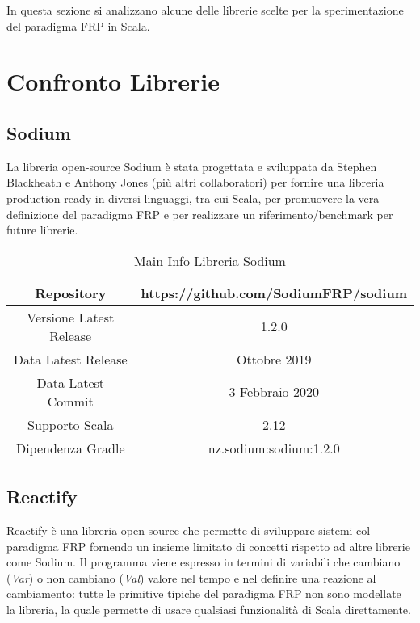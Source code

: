 \documentclass[../main.tex]{subfiles}
\begin{document}
In questa sezione si analizzano alcune delle librerie scelte per la sperimentazione del paradigma FRP in Scala.

\section{Confronto Librerie}

\subsection{Sodium}
La libreria open-source Sodium è stata progettata e sviluppata da Stephen Blackheath e Anthony Jones (più altri collaboratori) per fornire una libreria production-ready in diversi linguaggi, tra cui Scala, per promuovere la vera definizione del paradigma FRP e per realizzare un riferimento/benchmark per future librerie.

\begin{table}[H]
\centering
\begin{tabular}{|c|c|}
     \hline
     Repository & https://github.com/SodiumFRP/sodium \\
     \hline
     Versione Latest Release & 1.2.0 \\
     \hline
     Data Latest Release & Ottobre 2019 \\
     \hline
     Data Latest Commit & 3 Febbraio 2020 \\
     \hline
     Supporto Scala & 2.12 \\
     \hline
     Dipendenza Gradle & nz.sodium:sodium:1.2.0 \\
     \hline
\end{tabular}
\caption{Main Info Libreria Sodium}
\end{table}

\subsection{Reactify}
Reactify è una libreria open-source che permette di sviluppare sistemi col paradigma FRP fornendo un insieme limitato di concetti rispetto ad altre librerie come Sodium. Il programma viene espresso in termini di variabili che cambiano (\textit{Var}) o non cambiano (\textit{Val}) valore nel tempo e nel definire una reazione al cambiamento: tutte le primitive tipiche del paradigma FRP non sono modellate la libreria, la quale permette di usare qualsiasi funzionalità di Scala direttamente.
\end{document}
